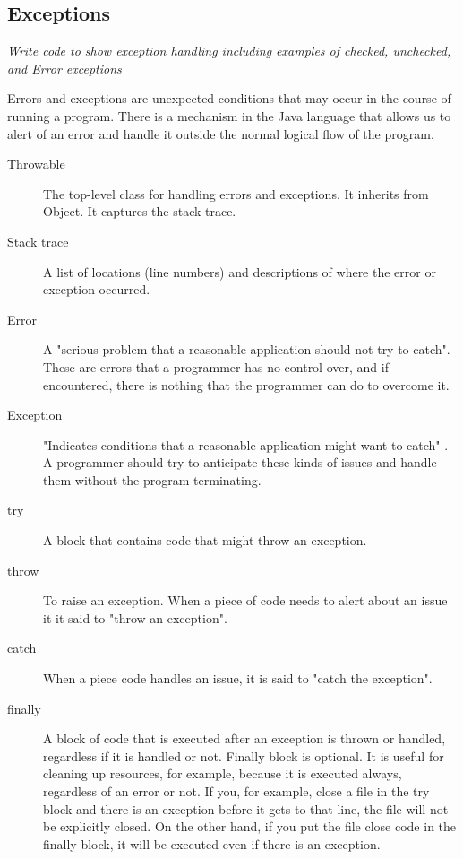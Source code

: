 \subsection{Exceptions}
\textit{Write code to show exception handling including examples of checked, unchecked, and Error exceptions}

Errors and exceptions are unexpected conditions that may occur in the course of running a program. There is a mechanism in the Java language that allows us to alert of an error and handle it outside the normal logical flow of the program.

\begin{description}
\item[Throwable] The top-level class for handling errors and exceptions. It inherits from Object. It captures the stack trace.
\item[Stack trace] A list of locations (line numbers) and descriptions of where the error or exception occurred.
\item[Error] A "serious problem that a reasonable application should not try to catch"\cite{error}. These are errors that a programmer has no control over, and if encountered, there is nothing that the programmer can do to overcome it.
\item[Exception] "Indicates conditions that a reasonable application might want to catch" \cite{exception}. A programmer should try to anticipate these kinds of issues and handle them without the program terminating.
\item[try] A block that contains code that might throw an exception.
\item[throw] To raise an exception. When a piece of code needs to alert about an issue it it said to "throw an exception".
\item[catch] When a piece code handles an issue, it is said to "catch the exception".
\item[finally] A block of code that is executed after an exception is thrown or handled, regardless if it is handled or not.  Finally block is optional. It is useful for cleaning up resources, for example, because it is executed always, regardless of an error or not. If you, for example, close a file in the try block and there is an exception before it gets to that line, the file will not be explicitly closed. On the other hand, if you put the file close code in the finally block, it will be executed even if there is an exception.
\end{description}

